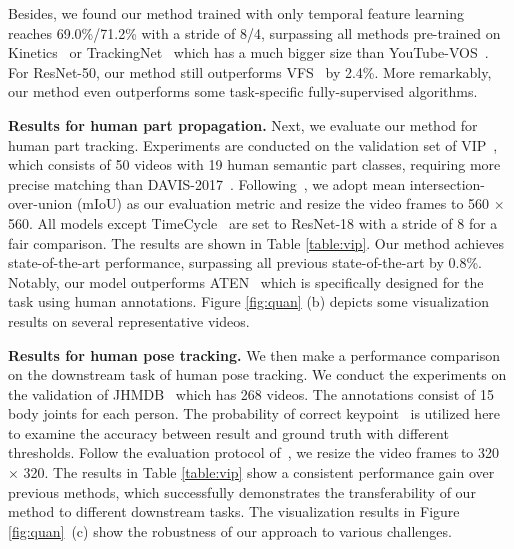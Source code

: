 \documentclass{article}
\begin{document}
Besides, we found our method trained with only temporal feature learning reaches 69.0\%/71.2\% with a stride of 8/4, surpassing all methods pre-trained on Kinetics~\cite{carreira2017quo} or TrackingNet~\cite{muller2018trackingnet} which has a much bigger size than YouTube-VOS~\cite{xu2018youtube}. For ResNet-50, our method still outperforms VFS~\cite{xu2021rethinking} by 2.4\%. More remarkably, our method even outperforms some task-specific fully-supervised algorithms\cite{maninis2018video}\cite{voigtlaender2017online}\cite{voigtlaender2019feelvos}.



\textbf{Results for human part propagation.} Next, we evaluate our method for human part tracking. Experiments are conducted on the validation set of VIP~\cite{zhou2018adaptive}, which consists of 50 videos with 19 human semantic part classes, requiring more precise matching than DAVIS-2017~\cite{pont20172017}. Following~\cite{zhou2018adaptive}, we adopt mean intersection-over-union (mIoU) as our evaluation metric and resize the video frames to 560 $\times$ 560. All models except TimeCycle~\cite{wang2019learning} are set to ResNet-18 with a stride of 8 for a fair comparison. The results are shown in Table \ref{table:vip}. Our method achieves state-of-the-art performance, surpassing all previous state-of-the-art by 0.8\%. Notably, our model outperforms ATEN~\cite{zhou2018adaptive} which is specifically designed for the task using human annotations. Figure \ref{fig:quan} (b) depicts some visualization results on several representative videos.


\textbf{Results for human pose tracking.} We then make a performance comparison on the downstream task of human pose tracking. We conduct the experiments on the validation of JHMDB~\cite{jhuang2013towards} which has 268 videos. The annotations consist of 15 body joints for each person. The probability of correct keypoint~\cite{yang2012articulated} is utilized here to examine the accuracy between result and ground truth with different thresholds. Follow the evaluation protocol of~\cite{jabri2020space}\cite{li2019joint}, we resize the video frames to 320 $\times$ 320. The results in Table \ref{table:vip} show a consistent performance gain over previous methods, which successfully demonstrates the transferability of our method to different downstream tasks. The visualization results in Figure \ref{fig:quan}~(c) show the robustness of our approach to various challenges.
\end{document}
